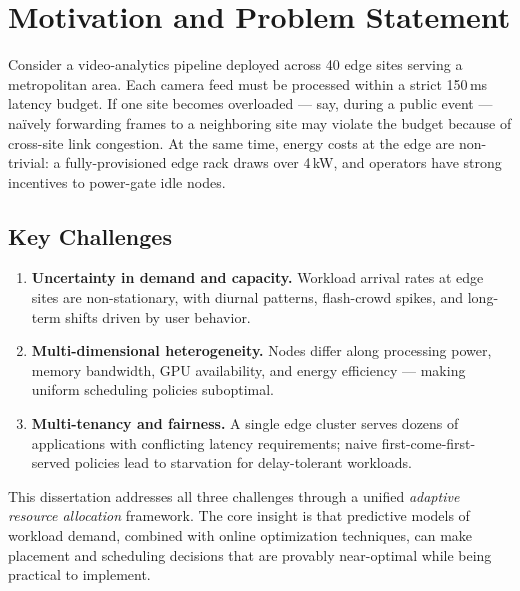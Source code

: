 \section{Motivation and Problem Statement}

Consider a video-analytics pipeline deployed across 40 edge sites serving a
metropolitan area. Each camera feed must be processed within a strict 150\,ms
latency budget. If one site becomes overloaded --- say, during a public event ---
na\"ively forwarding frames to a neighboring site may violate the budget because
of cross-site link congestion. At the same time, energy costs at the edge are
non-trivial: a fully-provisioned edge rack draws over 4\,kW, and operators have
strong incentives to power-gate idle nodes.

\subsection{Key Challenges}

\begin{enumerate}[label=\textbf{C\arabic*},leftmargin=*]
  \item \textbf{Uncertainty in demand and capacity.} Workload arrival rates at
  edge sites are non-stationary, with diurnal patterns, flash-crowd spikes, and
  long-term shifts driven by user behavior.

  \item \textbf{Multi-dimensional heterogeneity.} Nodes differ along
  processing power, memory bandwidth, GPU availability, and energy efficiency
  --- making uniform scheduling policies suboptimal.

  \item \textbf{Multi-tenancy and fairness.} A single edge cluster serves
  dozens of applications with conflicting latency requirements; naive
  first-come-first-served policies lead to starvation for delay-tolerant
  workloads.
\end{enumerate}

This dissertation addresses all three challenges through a unified
\emph{adaptive resource allocation} framework. The core insight is that
predictive models of workload demand, combined with online optimization
techniques, can make placement and scheduling decisions that are provably
near-optimal while being practical to implement.
